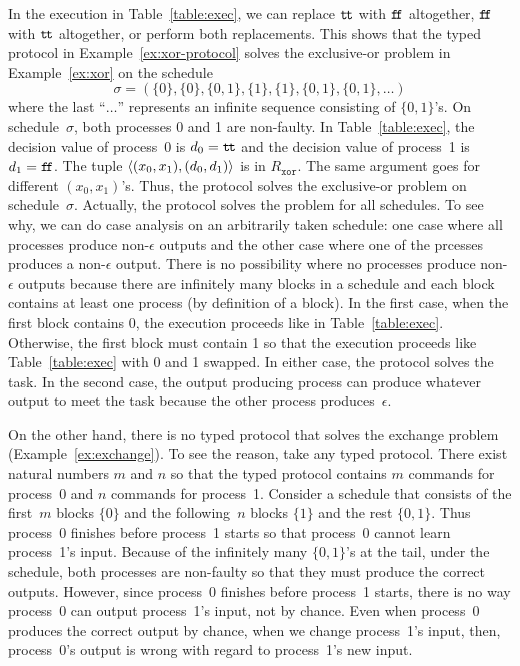  \begin{example}
  \label{ex:solv}
  In the execution in Table~\ref{table:exec}, we can replace $\texttt{t\kern -1.2pt t}$
  with $\texttt{f\kern -1.7pt f}$ altogether, $\texttt{f\kern -1.7pt f}$ with $\texttt{t\kern -1.2pt t}$ altogether, or perform
  both replacements.
  This shows that the typed protocol in Example~\ref{ex:xor-protocol}
  solves the exclusive-or problem in Example~\ref{ex:xor} on the
  schedule
  \[
  \sigma = (\{0\}, \{0\}, \{0,1\}, \{1\}, \{1\}, \{0,1\}, \{0,1\},\ldots)
  \] where
  the last ``$\ldots$'' represents an infinite sequence consisting of
  $\{0,1\}$'s.
  On schedule~$\sigma$, both processes 0 and 1 are non-faulty.
  In Table~\ref{table:exec}, the decision value of process~0 is $d_0 =
  \texttt{t\kern -1.2pt t}$ and the decision value of process~1 is $d_1=\texttt{f\kern -1.7pt f}$.
  The tuple $\langle{(x_0,x_1),(d_0,d_1)}\rangle$ is in $R_{\mathtt{xor}}$.
  The same argument goes for different $(x_0,x_1)$'s.
  Thus, the protocol solves the exclusive-or problem on schedule~$\sigma$.
  Actually, the protocol solves the problem for all schedules.
  To see why, we can do case analysis on an arbitrarily taken schedule:
  one case where all processes produce non-$\epsilon$ outputs and the other case where
  one of the prcesses produces a non-$\epsilon$ output.  There is no possibility where no
  processes produce non-$\epsilon$ outputs because there are infinitely many blocks in a
  schedule and each block contains at least one process (by definition
  of a block).
  In the first case, when the first block
  contains 0, the execution proceeds like in Table~\ref{table:exec}.
  Otherwise, the first block must contain 1 so that the execution
  proceeds like Table~\ref{table:exec} with 0 and 1 swapped.
  In either case, the protocol solves the task.
  In the second case, the output producing process can
  produce whatever output to meet the task because the other process
  produces~$\epsilon$.
 \end{example}
  \begin{example}
   On the other hand, there is no typed protocol that solves
   the exchange problem (Example~\ref{ex:exchange}).
   To see the reason, take any typed protocol.
   There exist natural numbers $m$ and $n$ so that
   the typed protocol contains $m$ commands
   for process~0 and $n$ commands for process~1.
   Consider a schedule that consists of the first~$m$ blocks $\{0\}$ and
   the following~$n$ blocks $\{1\}$ and the rest $\{0,1\}$.
   Thus process~0 finishes before process~1 starts so that process~0
   cannot learn process~1's input.
   Because of the infinitely many $\{0,1\}$'s at the tail,
   under the schedule, both processes are non-faulty so that they must
   produce the correct outputs.
   However, since process~0 finishes before process~1 starts, there is
   no way process~0 can output process~1's input, not by chance.
   Even when process~0 produces the correct output by chance, when we
   change process~1's input, then, process~0's output is wrong with
   regard to process~1's new input.
  \end{example}


